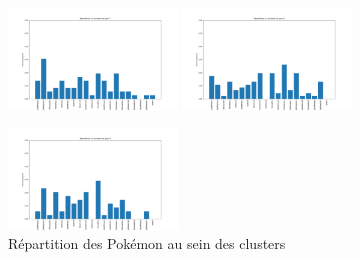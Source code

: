 \documentclass[a4paper,12pt]{article}
\begin{document}
\begin{figure}[!h]
    \vspace{1em}  %

    \includegraphics[width=0.4\textwidth]{Clustering/number_poke_gen/gen7.png}
    \includegraphics[width=0.4\textwidth]{Clustering/number_poke_gen/gen8.png}
    

    \vspace{1em}  %

    \includegraphics[width=0.4\textwidth]{Clustering/number_poke_gen/gen9.png}
    \caption{Répartition des Pokémon au sein des clusters}
    \label{fig:annexe1} %
\end{figure}
\end{document}
